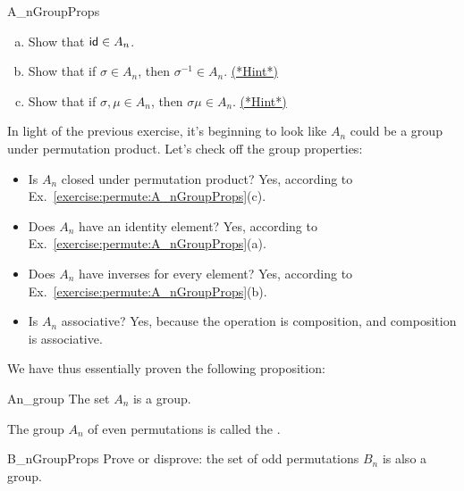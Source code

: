\begin{exercise}{A_nGroupProps}
\begin{enumerate}[(a)]
\item
Show that ${\sf{i}d}  \in A_n$.
\item
Show that if $\sigma \in A_n$, then $\sigma^{-1} \in A_n$.
\hyperref[sec:permute:hints]{(*Hint*)}
\item
Show that if $\sigma, \mu \in A_n$, then $\sigma \mu \in A_n$. 
\hyperref[sec:permute:hints]{(*Hint*)}
\end{enumerate}
\end{exercise}

In light of the previous exercise, it's beginning to look like $A_n$ could be a group under permutation product. Let's check off the group properties:
\begin{itemize}
\item Is $A_n$ closed under permutation product? Yes, according to Ex.~\ref{exercise:permute:A_nGroupProps}(c).
\item Does $A_n$ have an identity element? Yes, according to Ex.~\ref{exercise:permute:A_nGroupProps}(a).
\item Does $A_n$ have inverses for every element? Yes, according to Ex.~\ref{exercise:permute:A_nGroupProps}(b).
\item Is $A_n$ associative? Yes, because the operation is composition, and composition is associative.
\end{itemize}

\noindent
We have thus essentially proven the following proposition:

\begin{prop}{An_group}
The set $A_n$ is a group. 
\end{prop}


\begin{defn} \label{def:Alternating_Group}
The group $A_n$\label{alternatinggroup} of even permutations is called the . 
\end{defn}

\begin{exercise}{B_nGroupProps}
Prove or disprove: the set of odd permutations $B_n$ is also a group.
\end{exercise}


